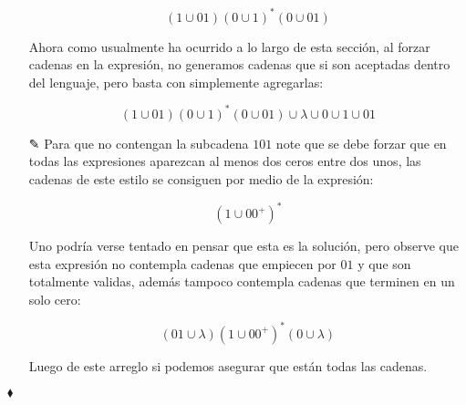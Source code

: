 \begin{itemize}
      $$(1\cup01)(0\cup1)^*(0\cup01)$$

      Ahora como usualmente ha ocurrido a lo largo de esta sección, al forzar cadenas en la expresión, no generamos cadenas que si son aceptadas dentro del lenguaje, pero basta con simplemente agregarlas:

      $$(1\cup01)(0\cup1)^*(0\cup01)\cup\lambda\cup0\cup1\cup01$$

      \item[✎]Para que no contengan la subcadena $101$ note que se debe forzar que en todas las expresiones aparezcan al menos dos ceros entre dos unos, las cadenas de este estilo se consiguen por medio de la expresión:

      $$(1\cup00^+)^*$$

      Uno podría verse tentado en pensar que esta es la solución, pero observe que esta expresión no contempla cadenas que empiecen por $01$ y que son totalmente validas, además tampoco contempla cadenas que terminen en un solo cero:

      $$(01\cup\lambda)(1\cup00^+)^*(0\cup\lambda)$$

      Luego de este arreglo si podemos asegurar que están todas las cadenas.
  
\end{itemize}

\hfill $\blacklozenge$